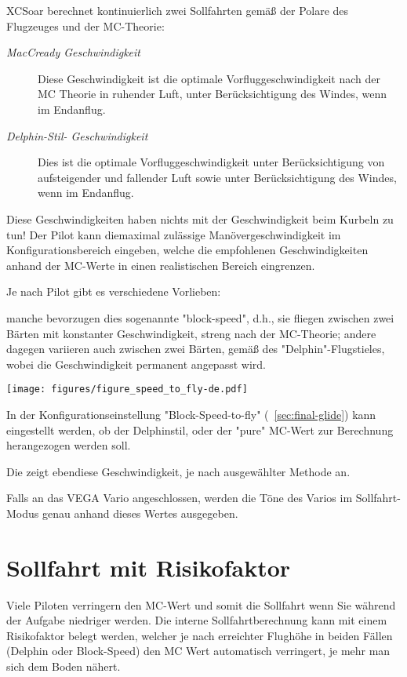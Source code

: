 \textsf{XCSoar} berechnet kontinuierlich zwei Sollfahrten gemäß der Polare des Flugzeuges und der
MC-Theorie:

\begin{description}
\item[\textit{MacCready Geschwindigkeit}]  Diese Geschwindigkeit ist die optimale Vorfluggeschwindigkeit nach der
MC Theorie in ruhender Luft, unter Berücksichtigung des Windes, wenn im Endanflug.
\item[\textit{Delphin-Stil- Geschwindigkeit}]  Dies ist die optimale Vorfluggeschwindigkeit unter
    Berücksichtigung von aufsteigender und fallender Luft sowie unter Berücksichtigung des Windes,
    wenn im Endanflug.
\end{description}

Diese Geschwindigkeiten haben nichts mit der Geschwindigkeit beim Kurbeln zu tun!
Der Pilot kann diemaximal zulässige Manövergeschwindigkeit im Konfigurationsbereich
eingeben, welche die empfohlenen Geschwindigkeiten anhand der MC-Werte in einen
realistischen Bereich eingrenzen.

Je nach Pilot gibt es verschiedene Vorlieben:

manche bevorzugen dies sogenannte "block-speed", d.h., sie fliegen zwischen zwei Bärten mit konstanter
Geschwindigkeit, streng nach der MC-Theorie; andere dagegen
variieren auch zwischen zwei Bärten, gemäß des "Delphin"-Flugstieles, wobei die
Geschwindigkeit permanent angepasst wird.


\begin{maxipage}
\begin{center}
\texttt{[image: figures/figure\_speed\_to\_fly-de.pdf]}
\end{center}
\end{maxipage}

In der Konfigurationseinstellung "Block-Speed-to-fly" (~\ref{sec:final-glide})
kann eingestellt werden, ob der Delphinstil, oder der "pure" MC-Wert zur
Berechnung herangezogen werden soll.

Die  zeigt ebendiese Geschwindigkeit, je nach
ausgewählter Methode an.

Falls an das VEGA Vario angeschlossen, werden die Töne des Varios im Sollfahrt-Modus
genau anhand dieses Wertes ausgegeben.


\section{Sollfahrt  mit Risikofaktor}\label{sec:safety-factor}
Viele Piloten verringern den MC-Wert und somit die Sollfahrt wenn Sie während der Aufgabe niedriger werden.
 Die interne Sollfahrtberechnung kann mit einem Risikofaktor belegt werden, welcher je nach erreichter Flughöhe in beiden Fällen
 (Delphin oder Block-Speed) den MC Wert automatisch verringert, je mehr man sich dem Boden nähert.

